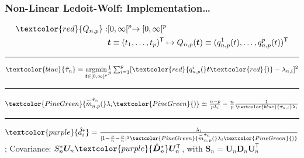 \documentclass[xcolor=dvipsnames]{beamer}
\def\B#1{\bm{#1}}
\def\trans{^\mathsf{T}}
\begin{document}
\begin{frame}
  \frametitle{Non-Linear Ledoit-Wolf: Implementation\ldots}

  \begin{equation*}
    \begin{split}
      \textcolor{red}{Q_{n,p}}: & [0, \infty[^p \rightarrow [0,\infty[^p \\
              & \B{t} \equiv (t_1,\ldots,t_p)\trans
              \mapsto Q_{n,p}(\B{t}) \equiv
              (q^1_{n,p}(t),\ldots,q^p_{n,p}(t))\trans
    \end{split}
  \end{equation*}

  \vfill
  \hrule{}
  \vfill

  $\textcolor{blue}{\hat{\B{\tau}}_n} = \underset{\B{t} \in [0, \infty[^p}{\text{argmin}} 
      \frac{1}{p} \sum^p_{i=1}[\textcolor{red}{q^i_{n,p}(}\B{t}\textcolor{red}{)} - \lambda_{n,i}]^2$

  \vfill
  \hrule{}
  \vfill

  $\textcolor{PineGreen}{\overset{\smile}{m}^{\hat{\B{\tau}}_n}_{n,p}(}\lambda_i\textcolor{PineGreen}{)} \simeq \frac{n-p}{p\lambda_i} - \frac{n}{p}\frac{1}{\textcolor{blue}{\hat{\B{\tau}}_{n,i}}\lambda_i}$

  \vfill
  \hrule{}
  \vfill

  $\textcolor{purple}{\hat{d}_i^*} = \frac{\lambda_i}{|1 - \frac{p}{n} - \frac{p}{n}|^2\textcolor{PineGreen}{\overset{\smile}{m}^{\hat{\B{\tau}}_n}_{n,p}(}\lambda_i\textcolor{PineGreen}{)}}$; {\scriptsize Covariance:} $S_n^*\B{U}_n\textcolor{purple}{\hat{\B{D}}^*_n}\B{U}_n\trans${\scriptsize , with }$\B{S}_n=\B{U}_n\B{D}_n\B{U}_n\trans$
  
\end{frame}
\end{document}
